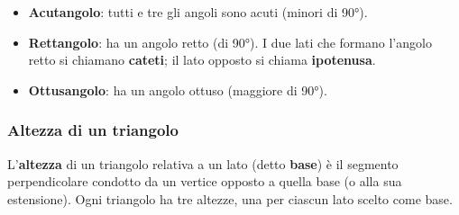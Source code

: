 \begin{itemize}[leftmargin=1.5em]
    \item \textbf{Acutangolo}: tutti e tre gli angoli sono acuti (minori di 90°).
    \item \textbf{Rettangolo}: ha un angolo retto (di 90°). I due lati che formano l'angolo retto si chiamano \textbf{cateti}; il lato opposto si chiama \textbf{ipotenusa}.
    \item \textbf{Ottusangolo}: ha un angolo ottuso (maggiore di 90°).
\end{itemize}

\begin{center}
\end{center}

\subsubsection*{Altezza di un triangolo}

\begin{definizione}
    L'\textbf{altezza} di un triangolo relativa a un lato (detto \textbf{base}) è il segmento perpendicolare condotto da un vertice opposto a quella base (o alla sua estensione). Ogni triangolo ha tre altezze, una per ciascun lato scelto come base.
\end{definizione}

\begin{center}
\end{center}

